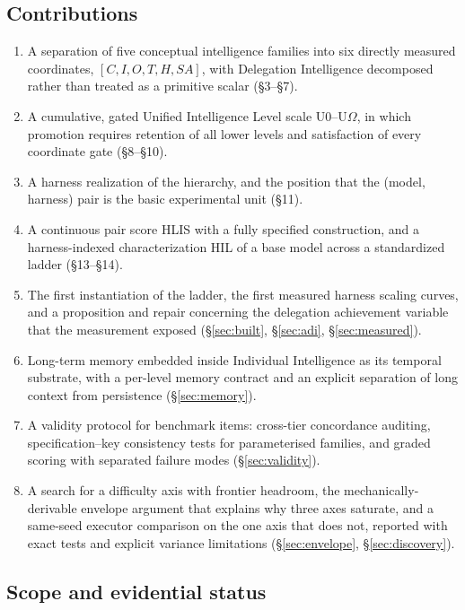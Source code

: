 \documentclass[11pt]{article}
\theoremstyle{definition}
\newcommand{\Om}{\ensuremath{\Omega}}
\begin{document}
\subsection{Contributions}

\begingroup\sloppy
\begin{enumerate}
\item A separation of five conceptual intelligence families into six directly measured coordinates,
      $[C,I,O,T,H,SA]$, with Delegation Intelligence decomposed rather than treated as a primitive scalar (\S3--\S7).
\item A cumulative, gated Unified Intelligence Level scale U0--U\Om{}, in which promotion requires retention of all lower levels and satisfaction of every coordinate gate (\S8--\S10).
\item A harness realization of the hierarchy, and the position that the (model, harness) pair is the basic experimental unit (\S11).
\item A continuous pair score HLIS with a fully specified construction, and a harness-indexed characterization HIL of a base model across a standardized ladder (\S13--\S14).
\item The first instantiation of the ladder, the first measured harness scaling curves, and a proposition and repair concerning the delegation achievement variable that the measurement exposed (\S\ref{sec:built}, \S\ref{sec:adi}, \S\ref{sec:measured}).
\item Long-term memory embedded inside Individual Intelligence as its temporal substrate, with a per-level memory contract and an explicit separation of long context from persistence (\S\ref{sec:memory}).
\item A validity protocol for benchmark items: cross-tier concordance auditing, specification--key consistency tests for parameterised families, and graded scoring with separated failure modes (\S\ref{sec:validity}).
\item A search for a difficulty axis with frontier headroom, the mechanically-derivable envelope argument that explains why three axes saturate, and a same-seed executor comparison on the one axis that does not, reported with exact tests and explicit variance limitations (\S\ref{sec:envelope}, \S\ref{sec:discovery}).
\end{enumerate}
\endgroup

\subsection{Scope and evidential status}
\end{document}
